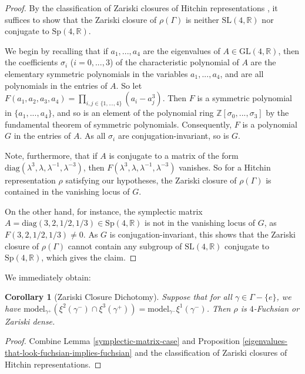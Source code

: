 \documentclass[12pt,a4paper]{amsart}
\theoremstyle{definition}
\theoremstyle{plain}
\newtheorem{corollary}[theorem]{Corollary}
\numberwithin{equation}{section}
\begin{document}
\begin{proof}
     By the classification of Zariski closures of Hitchin representations \cite{sambarino2020infinitesimal}, it suffices to show that the Zariski closure of $\rho(\Gamma)$ is neither $\text{SL}(4,\mathbb{R})$ nor conjugate to $\text{Sp}(4, \mathbb{R})$.
     
    We begin by recalling that if $a_1, ..., a_4$ are the eigenvalues of $A \in \text{GL}(4,\mathbb{R})$, then the coefficients $\sigma_i$ ($i = 0,...,3$) of the characteristic polynomial of $A$ are the elementary symmetric polynomials in the variables $a_1,...,a_4$, and are all polynomials in the entries of $A$. So let $F(a_1,a_2,a_3,a_4) = \prod_{i,j \in \{1,...,4\}} (a_i - a_j^3)$. Then $F$ is a symmetric polynomial in $\{a_1,...,a_4\}$, and so is an element of the polynomial ring $\mathbb{Z}[\sigma_0,...,\sigma_3]$ by the fundamental theorem of symmetric polynomials. Consequently, $F$ is a polynomial $G$ in the entries of $A$. As all $\sigma_i$ are conjugation-invariant, so is $G$.

    Note, furthermore, that if $A$ is conjugate to a matrix of the form $\text{diag}(\lambda^3, \lambda, \lambda^{-1}, \lambda^{-3})$, then $F(\lambda^3, \lambda, \lambda^{-1}, \lambda^{-3})$ vanishes. So for a Hitchin representation $\rho$ satisfying our hypotheses, the Zariski closure of $\rho(\Gamma)$ is contained in the vanishing locus of $G$.

    On the other hand, for instance, the symplectic matrix $A = \text{diag}(3, 2, 1/2, 1/3) \in \text{Sp}(4, \mathbb{R})$ is not in the vanishing locus of $G$, as $F(3,2,1/2,1/3) \neq 0$. As $G$ is conjugation-invariant, this shows that the Zariski closure of $\rho(\Gamma)$ cannot contain any subgroup of $\text{SL}(4, \mathbb{R})$ conjugate to $\text{Sp}(4, \mathbb{R})$, which gives the claim. \end{proof}

We immediately obtain:

\begin{corollary}[Zariski Closure Dichotomy]\label{proposition-zariski-dichotomy}
    Suppose that for all $\gamma \in \Gamma - \{e\}$, we have {\rm{$\text{model}_{\gamma^+} (\xi^2(\gamma^-) \cap \xi^3(\gamma^+) ) = \text{model}_{\gamma^-} \xi^1(\gamma^-)$}}. Then $\rho$ is $4$-Fuchsian or Zariski dense.   
\end{corollary}

\begin{proof}
    Combine Lemma \ref{symplectic-matrix-case} and Proposition \ref{eigenvalues-that-look-fuchsian-implies-fuchsian} and the classification of Zariski closures of Hitchin representations.
\end{proof}
\end{document}

